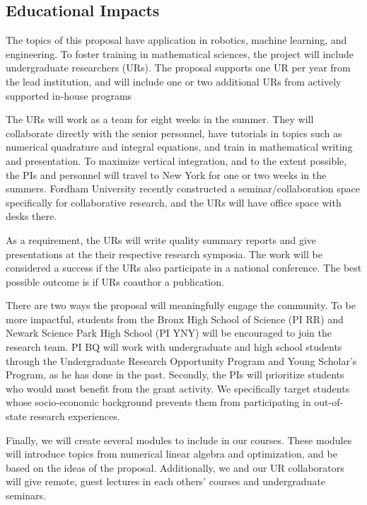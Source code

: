 \subsection{Educational Impacts}
\label{subsec:Educational_plans}
The topics of this proposal have application in robotics, machine
learning, and engineering. To foster training in mathematical sciences,
the project will include undergraduate researchers (URs). The proposal
supports one UR per year from the lead institution, and will include one
or two additional URs from actively supported in-house programs

The URs will work as a team for eight weeks in the summer. They will
collaborate directly with the senior personnel, have tutorials in topics
such as numerical quadrature and integral equations, and train in
mathematical writing and presentation. To maximize vertical integration,
and to the extent possible, the PIs and personnel will travel to New
York for one or two weeks in the summers. Fordham University recently
constructed a seminar/collaboration space specifically for collaborative
research, and the URs will have office space with desks there.

As a requirement, the URs will write quality summary reports and give
presentations at the their respective research symposia. The work will
be considered a success if the URs also participate in a national
conference. The best possible outcome is if URs coauthor a publication.

There are two ways the proposal will meaningfully engage the community.
To be more impactful, students from the Bronx High School of Science (PI
RR) and Newark Science Park High School (PI YNY) will be encouraged to
join the research team. PI BQ will work with undergraduate and high
school students through the Undergraduate Research Opportunity Program
and Young Scholar's Program, as he has done in the past. Secondly, the
PIs will prioritize students who would most benefit from the grant
activity. We specifically target students whose socio-economic
background prevents them from participating in out-of-state research
experiences. 

Finally, we will create several modules to include in our courses. These
modules will introduce topics from numerical linear algebra and
optimization, and be based on the ideas of the proposal. Additionally,
we and our UR collaborators will give remote, guest lectures in each
others' courses and undergraduate seminars. 

